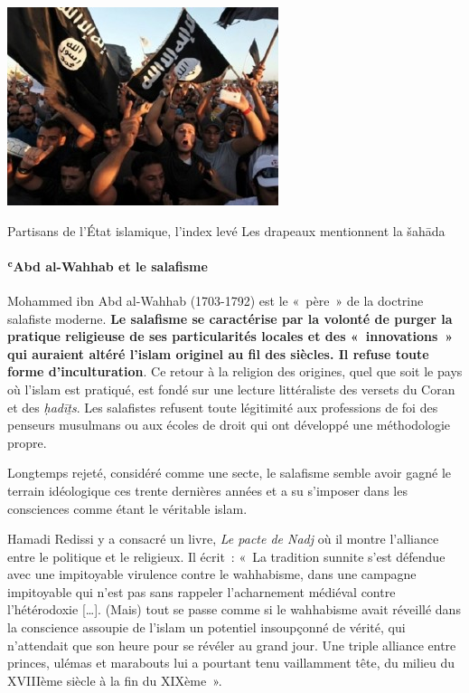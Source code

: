 \begin{marginfigure}
\includegraphics[width=\textwidth]{Images/image072.jpg}
\caption{Partisans de l'État islamique, l'index levé Les drapeaux mentionnent la šahāda}
\end{marginfigure}



\paragraph{ʿAbd al-Wahhab et le
salafisme}

Mohammed ibn Abd al-Wahhab (1703-1792) est le «~père~» de la doctrine
salafiste moderne. \textbf{Le salafisme se caractérise par la volonté de
purger la pratique religieuse de ses particularités locales et des
«~innovations~» qui auraient altéré l'islam originel au fil des
siècles}\textbf{. Il refuse toute forme d'inculturation}. Ce retour à la
religion des origines, quel que soit le pays où l'islam est pratiqué,
est fondé sur une lecture littéraliste des versets du Coran et des
\emph{ḥadīṯs}. Les salafistes refusent toute légitimité aux professions
de foi des penseurs musulmans ou aux écoles de droit qui ont développé
une méthodologie propre.

Longtemps rejeté, considéré comme une secte, le salafisme semble avoir
gagné le terrain idéologique ces trente dernières années et a su
s'imposer dans les consciences comme étant le véritable islam.

Hamadi Redissi y a consacré un livre, \emph{Le pacte de Nadj} où il
montre l'alliance entre le politique et le religieux. Il écrit~: «~La
tradition sunnite s'est défendue avec une impitoyable virulence contre
le wahhabisme, dans une campagne impitoyable qui n'est pas sans rappeler
l'acharnement médiéval contre l'hétérodoxie {[}\ldots{]}. (Mais) tout se
passe comme si le wahhabisme avait réveillé dans la conscience assoupie
de l'islam un potentiel insoupçonné de vérité, qui n'attendait que son
heure pour se révéler au grand jour. Une triple alliance entre princes,
ulémas et marabouts lui a pourtant tenu vaillamment tête, du milieu du
XVIIIème siècle à la fin du XIXème~».

